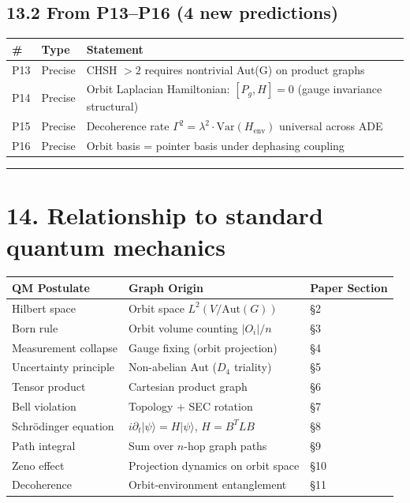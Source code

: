 \documentclass[11pt,a4paper]{article}
\begin{document}
\subsection*{13.2 From P13–P16 (4 new predictions)}

\begin{longtable}[]{@{}lll@{}}
\toprule
\# & Type & Statement \\
\midrule\endhead
P13 & Precise & CHSH $> 2$ requires nontrivial Aut(G) on product graphs \\
P14 & Precise & Orbit Laplacian Hamiltonian: $[P_g, H] = 0$ (gauge invariance structural) \\
P15 & Precise & Decoherence rate $\Gamma^2 = \lambda^2 \cdot \text{Var}(H_{\text{env}})$ universal across ADE \\
P16 & Precise & Orbit basis = pointer basis under dephasing coupling \\
\bottomrule
\end{longtable}

\begin{center}\rule{0.5\linewidth}{0.4pt}\end{center}

\section*{14. Relationship to standard quantum mechanics}

\begin{longtable}[]{@{}lll@{}}
\toprule
QM Postulate & Graph Origin & Paper Section \\
\midrule\endhead
Hilbert space & Orbit space $L^2(V/\text{Aut}(G))$ & §2 \\
Born rule & Orbit volume counting $|O_i|/n$ & §3 \\
Measurement collapse & Gauge fixing (orbit projection) & §4 \\
Uncertainty principle & Non-abelian Aut ($D_4$ triality) & §5 \\
Tensor product & Cartesian product graph & §6 \\
Bell violation & Topology + SEC rotation & §7 \\
Schrödinger equation & $i\partial_t |\psi\rangle = H|\psi\rangle$, $H = B^T L B$ & §8 \\
Path integral & Sum over $n$-hop graph paths & §9 \\
Zeno effect & Projection dynamics on orbit space & §10 \\
Decoherence & Orbit-environment entanglement & §11 \\
\bottomrule
\end{longtable}
\end{document}
